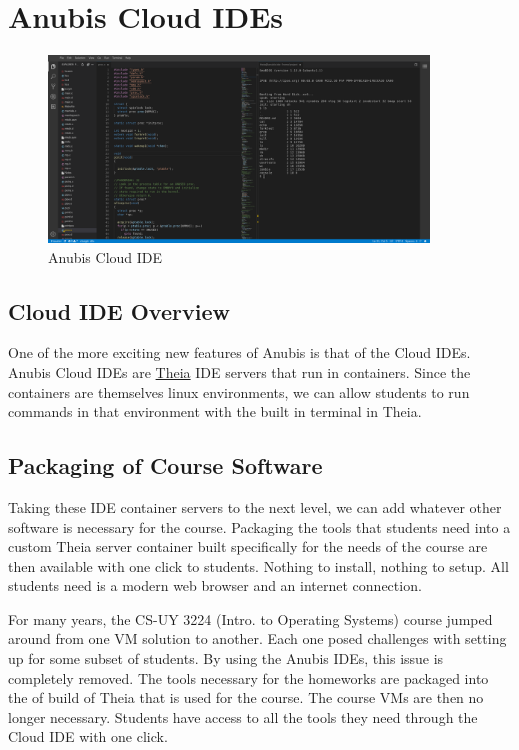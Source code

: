 \chapter{Anubis Cloud IDEs}\label{ch:cloud_ides}

\begin{figure}[ht]
    \centering
    \includegraphics[width=0.9\textwidth]{figures/theia2}
    \caption{Anubis Cloud IDE\label{fig:theia2}}
\end{figure}

\section{Cloud IDE Overview}\label{sec:cloud-ide-overview}

One of the more exciting new features of Anubis is that of the Cloud IDEs.
Anubis Cloud IDEs are \href{https://theia-ide.org/}{Theia} IDE servers that run in containers.
Since the containers are themselves linux environments, we can allow students
to run commands in that environment with the built in terminal in Theia.

\section{Packaging of Course Software}\label{sec:packaing-of-course-software}

Taking these IDE container servers to the next level, we can add whatever 
other software is necessary for the course.
Packaging the tools that students need into a custom Theia server container
built specifically for the needs of the course are then available with 
one click to students.
Nothing to install, nothing to setup.
All students need is a modern web browser and an internet connection.

For many years, the CS-UY 3224 (Intro. to Operating Systems) course
jumped around from one VM solution to another.
Each one posed challenges with setting up for some subset of students.
By using the Anubis IDEs, this issue is completely removed.
The tools necessary for the homeworks are packaged into the of build 
of Theia that is used for the course.
The course VMs are then no longer necessary.
Students have access to all the tools they need through the Cloud IDE
with one click.

